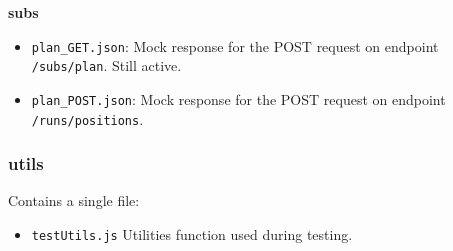 \noindent \textbf{subs}
\begin{itemize}
     \item \texttt{plan\_GET.json}: Mock response for the POST request on endpoint \texttt{/subs/plan}. Still active.
    \item \texttt{plan\_POST.json}: Mock response for the POST request on endpoint \texttt{/runs/positions}.
\end{itemize}

\subsubsection{utils}
Contains a single file: 
\begin{itemize}
    \item \texttt{testUtils.js} Utilities function used during testing.
\end{itemize}


